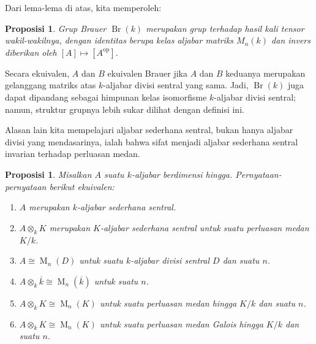 \documentclass[12pt]{article}
\theoremstyle{plain}
\newtheorem{proposition}[theorem]{Proposisi}
\theoremstyle{definition}
\theoremstyle{remark}
\numberwithin{equation}{section}
\begin{document}
Dari lema-lema di atas, kita memperoleh:

\begin{proposition}
Grup Brauer $\operatorname{Br}(k)$ merupakan grup terhadap
hasil kali tensor wakil-wakilnya,
dengan identitas berupa kelas aljabar matriks $M_n(k)$
dan invers diberikan oleh $[A] \mapsto [A^{\mathrm{op}}]$.
\end{proposition}

Secara ekuivalen, $A$ dan $B$ ekuivalen Brauer jika $A$ dan $B$ keduanya
merupakan gelanggang matriks atas $k$-aljabar divisi sentral yang sama.
Jadi, $\operatorname{Br}(k)$ juga dapat dipandang sebagai himpunan kelas
isomorfisme $k$-aljabar divisi sentral; namun, struktur grupnya
lebih sukar dilihat dengan definisi ini.

Alasan lain kita mempelajari aljabar sederhana sentral, bukan hanya
aljabar divisi yang mendasarinya, ialah bahwa sifat menjadi aljabar sederhana
sentral invarian terhadap perluasan medan.

\begin{proposition}
Misalkan $A$ suatu $k$-aljabar berdimensi hingga.
Pernyataan-pernyataan berikut ekuivalen:
\begin{enumerate}
\item[(a)] $A$ merupakan $k$-aljabar sederhana sentral.
\item[(b)] $A \otimes_k K$ merupakan $K$-aljabar sederhana sentral untuk suatu perluasan
medan $K/k$.
\item[(c)] $A \cong \operatorname{M}_n(D)$ untuk suatu $k$-aljabar divisi sentral
$D$ dan suatu $n$.
\item[(d)] $A \otimes_k \overline{k} \cong \operatorname{M}_n(\overline{k})$
untuk suatu $n$.
\item[(e)] $A \otimes_k K \cong \operatorname{M}_n(K)$
untuk suatu perluasan medan hingga $K/k$ dan suatu $n$.
\item[(f)] $A \otimes_k K \cong \operatorname{M}_n(K)$
untuk suatu perluasan medan Galois hingga $K/k$ dan suatu $n$.
\end{enumerate}
\end{proposition}
\end{document}
